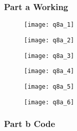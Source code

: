 			\subsubsection{Part a Working}
			\begin{figure}[position = here]
				\begin{centering}
					\texttt{[image: q8a\_1]}\\
				\end{centering}
			\end{figure}
			\pagebreak
			\begin{figure}[position = here]
				\begin{centering}
					\texttt{[image: q8a\_2]}\\
				\end{centering}
			\end{figure}
			\pagebreak
			\begin{figure}[position = here]
				\begin{centering}
					\texttt{[image: q8a\_3]}\\
				\end{centering}
			\end{figure}
			\pagebreak
			\begin{figure}[position = here]
				\begin{centering}
					\texttt{[image: q8a\_4]}\\
				\end{centering}
			\end{figure}
			\pagebreak
			\begin{figure}[position = here]
				\begin{centering}
					\texttt{[image: q8a\_5]}\\
				\end{centering}
			\end{figure}
			\pagebreak
			\begin{figure}[position = here]
				\begin{centering}
					\texttt{[image: q8a\_6]}\\
				\end{centering}
			\end{figure}
			\pagebreak
			\subsubsection{Part b Code}
			